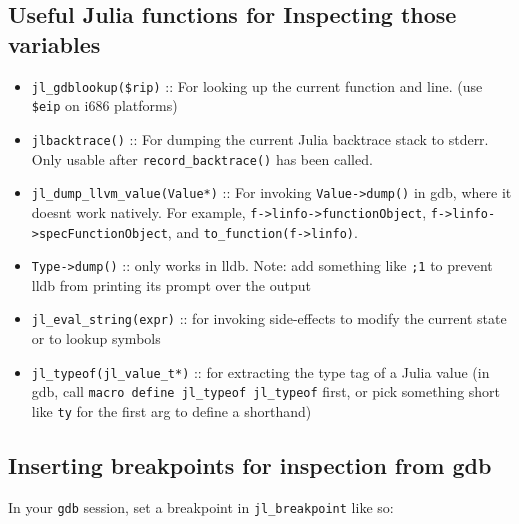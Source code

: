 \hypertarget{7178558395386377758}{}


\subsection{Useful Julia functions for Inspecting those variables}



\begin{itemize}
\item \texttt{jl\_gdblookup(\$rip)} :: For looking up the current function and line. (use \texttt{\$eip} on i686 platforms)


\item \texttt{jlbacktrace()} :: For dumping the current Julia backtrace stack to stderr. Only usable after \texttt{record\_backtrace()} has been called.


\item \texttt{jl\_dump\_llvm\_value(Value*)} :: For invoking \texttt{Value->dump()} in gdb, where it doesn{\textquotesingle}t work natively. For example, \texttt{f->linfo->functionObject}, \texttt{f->linfo->specFunctionObject}, and \texttt{to\_function(f->linfo)}.


\item \texttt{Type->dump()} :: only works in lldb. Note: add something like \texttt{;1} to prevent lldb from printing its prompt over the output


\item \texttt{jl\_eval\_string({\textquotedbl}expr{\textquotedbl})} :: for invoking side-effects to modify the current state or to lookup symbols


\item \texttt{jl\_typeof(jl\_value\_t*)} :: for extracting the type tag of a Julia value (in gdb, call \texttt{macro define jl\_typeof jl\_typeof} first, or pick something short like \texttt{ty} for the first arg to define a shorthand)

\end{itemize}


\hypertarget{1392415358123037898}{}


\subsection{Inserting breakpoints for inspection from gdb}



In your \texttt{gdb} session, set a breakpoint in \texttt{jl\_breakpoint} like so:




